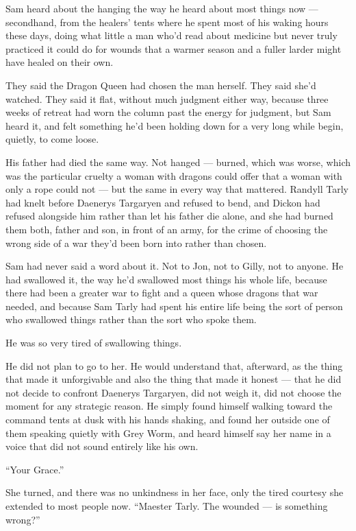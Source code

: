 Sam heard about the hanging the way he heard about most things now — secondhand, from the healers’ tents where he spent most of his waking hours these days, doing what little a man who’d read about medicine but never truly practiced it could do for wounds that a warmer season and a fuller larder might have healed on their own.

They said the Dragon Queen had chosen the man herself. They said she’d watched. They said it flat, without much judgment either way, because three weeks of retreat had worn the column past the energy for judgment, but Sam heard it, and felt something he’d been holding down for a very long while begin, quietly, to come loose.

His father had died the same way. Not hanged — burned, which was worse, which was the particular cruelty a woman with dragons could offer that a woman with only a rope could not — but the same in every way that mattered. Randyll Tarly had knelt before Daenerys Targaryen and refused to bend, and Dickon had refused alongside him rather than let his father die alone, and she had burned them both, father and son, in front of an army, for the crime of choosing the wrong side of a war they’d been born into rather than chosen.

Sam had never said a word about it. Not to Jon, not to Gilly, not to anyone. He had swallowed it, the way he’d swallowed most things his whole life, because there had been a greater war to fight and a queen whose dragons that war needed, and because Sam Tarly had spent his entire life being the sort of person who swallowed things rather than the sort who spoke them.

He was so very tired of swallowing things.

\sceneBreak

He did not plan to go to her. He would understand that, afterward, as the thing that made it unforgivable and also the thing that made it honest — that he did not decide to confront Daenerys Targaryen, did not weigh it, did not choose the moment for any strategic reason. He simply found himself walking toward the command tents at dusk with his hands shaking, and found her outside one of them speaking quietly with Grey Worm, and heard himself say her name in a voice that did not sound entirely like his own.

“Your Grace.”

She turned, and there was no unkindness in her face, only the tired courtesy she extended to most people now. “Maester Tarly. The wounded — is something wrong?”

